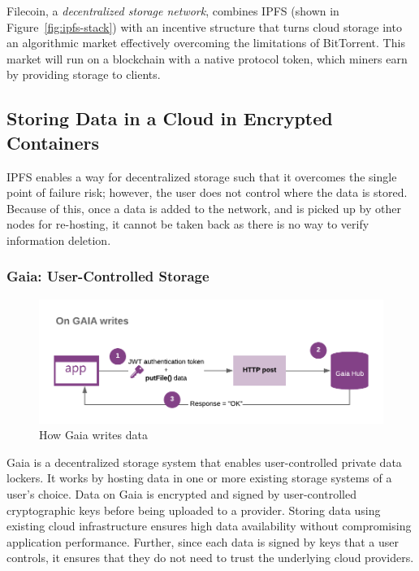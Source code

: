 			Filecoin\cite{benet2018filecoin}, a \textit{decentralized storage network}, combines IPFS (shown in Figure~\ref{fig:ipfs-stack}) with an incentive structure that turns cloud storage into an algorithmic market effectively overcoming the limitations of BitTorrent. This market will run on a blockchain with a native protocol token, which miners earn by providing storage to clients.
		
	\subsection{Storing Data in a Cloud in Encrypted Containers}
		IPFS enables a way for decentralized storage such that it overcomes the single point of failure risk; however, the user does not control where the data is stored. Because of this, once a data is added to the network, and is picked up by other nodes for re-hosting, it cannot be taken back as there is no way to verify information deletion\cite{github:ipfs:9}.
		
		\subsubsection{Gaia: User-Controlled Storage}\label{sec:blockstack-gaia}
		\begin{figure}[h]
			\includegraphics[width=\linewidth]{figures/gaia-writes}
			\caption{\label{fig:gaia-writes} How Gaia writes data\protect\cite{image:gaia:write}}
		\end{figure}
		
		Gaia\cite{ali2016blockstack} is a decentralized storage system that enables user-controlled private data lockers. It works by hosting data in one or more existing storage systems of a user's choice. Data on Gaia is encrypted and signed by user-controlled cryptographic keys before being uploaded to a provider. Storing data using existing cloud infrastructure ensures high data availability without compromising application performance. Further, since each data is signed by keys that a user controls, it ensures that they do not need to trust the underlying cloud providers.
		
